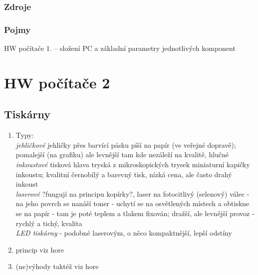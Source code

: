 \documentclass[12pt]{article}
\begin{document}
\subsubsection{Zdroje}
\subsubsection{Pojmy}
HW počítače 1. – složení PC a základní parametry jednotlivých komponent

\section{HW počítače 2}
\subsection{Tiskárny}
\begin{enumerate}
\item Typy:\\
\emph{jehličkové} jehličky přes barvící pásku píší na papír (ve veřejné dopravě); pomalejší (na grafiku) ale levnější tam kde nezáleží na kvalitě, hlučné \\
\emph{inkoustové} tisková hlava tryská z mikroskopických trysek miniaturní kapičky inkoustu; kvalitní černobílý a barevný tisk, nízká cena, ale často drahý inkoust \\
\emph{laserové}  ?fungují na principu kopírky?, laser na fotocitlivý (selenový) válec - na jeho povrch se nanáší toner - uchytí se na osvětlených místech a obtiskne se na papír - tam je poté teplem a tlakem fixován; dražší, ale levnější provoz - rychlý a tichý, kvalita\\
\emph{LED tiskárny} - podobné laserovým, o něco kompaktnější, lepší odstíny
\item princip viz hore
\item (ne)výhody taktéž viz hore
\end{enumerate}
\end{document}
